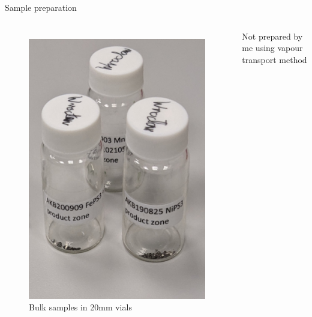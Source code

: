 \documentclass[
	10pt,
]{beamer}
\begin{document}
\begin{frame}{Sample preparation}
	\begin{columns}
		\begin{figure}
			\centering
			\includegraphics[width=\textwidth]{../../photos/bulk_sample.jpg}
			Bulk samples in 20mm vials
		\end{figure}
		Not prepared by me using vapour transport method


\end{columns}
\end{frame}
\end{document}
